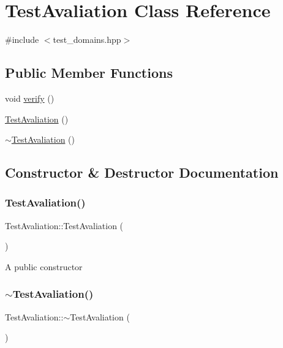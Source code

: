 \hypertarget{class_test_avaliation}{}\section{Test\+Avaliation Class Reference}
\label{class_test_avaliation}


{\ttfamily \#include $<$test\+\_\+domains.\+hpp$>$}

\subsection*{Public Member Functions}
\begin{DoxyCompactItemize}
\item 
void \hyperlink{class_test_avaliation_a8c6b9d3e1660e1cf24e335f90f22b2da}{verify} ()
\item 
\hyperlink{class_test_avaliation_adc24d227366745218f50c1add1b1af18}{Test\+Avaliation} ()
\item 
\hyperlink{class_test_avaliation_aafdef825a4b4cd68e91102abc249c751}{$\sim$\+Test\+Avaliation} ()
\end{DoxyCompactItemize}


\subsection{Constructor \& Destructor Documentation}
\mbox{\label{class_test_avaliation_adc24d227366745218f50c1add1b1af18}} 
\subsubsection{\texorpdfstring{Test\+Avaliation()}{TestAvaliation()}}
{\footnotesize\ttfamily Test\+Avaliation\+::\+Test\+Avaliation (\begin{DoxyParamCaption}{ }\end{DoxyParamCaption})}

A public constructor \mbox{\label{class_test_avaliation_aafdef825a4b4cd68e91102abc249c751}} 
\subsubsection{\texorpdfstring{$\sim$\+Test\+Avaliation()}{~TestAvaliation()}}
{\footnotesize\ttfamily Test\+Avaliation\+::$\sim$\+Test\+Avaliation (\begin{DoxyParamCaption}{ }\end{DoxyParamCaption})}

